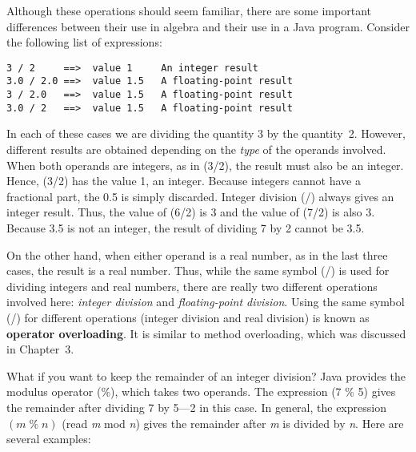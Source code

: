 Although these operations should seem familiar, there are some important
differences between their use in algebra and their use in a Java
program.   Consider the following list of expressions:

\begin{jjjlisting}
\begin{lstlisting}
3 / 2     ==>  value 1     An integer result
3.0 / 2.0 ==>  value 1.5   A floating-point result
3 / 2.0   ==>  value 1.5   A floating-point result
3.0 / 2   ==>  value 1.5   A floating-point result
\end{lstlisting}
\end{jjjlisting}

\noindent In each of these cases we are dividing the quantity 3 by
the quantity~2. However, different results are obtained depending on
the {\it type} of the operands involved.  When both operands are
integers, as in (3/2), the result must also be an
integer. Hence, (3/2) has the value 1, an
integer.   Because integers cannot have a fractional part, the 0.5 is
simply discarded.   Integer division (/) always gives an integer
result.  Thus, the value of (6/2) is 3 and the value of (7/2) is also
3. Because 3.5 is not an integer, the result of dividing 7 by 2 cannot
be 3.5.  


\noindent On the other hand, when either operand is a real number, as in the
last three cases, the result is a real number.  Thus, while the same
symbol (/) is used for dividing integers and real numbers, there are
really two different operations involved here: {\it integer division}
and {\it floating-point division}. Using the same symbol (/) for different operations
(integer division and real division) is known as {\bf operator
overloading}. It is similar to method overloading, which was discussed
in Chapter~3.

What if you want to keep the remainder of an integer division?  Java
provides the modulus operator (\%), which takes two 
operands.  The expression (7 \% 5) gives the remainder after dividing 7
by 5---2 in this case.   In general, the expression $(m \; \% \; n)$ (read {\it m}
mod {\it n}) gives the remainder after {\it m} is divided by {\it n}. Here are
several examples:

